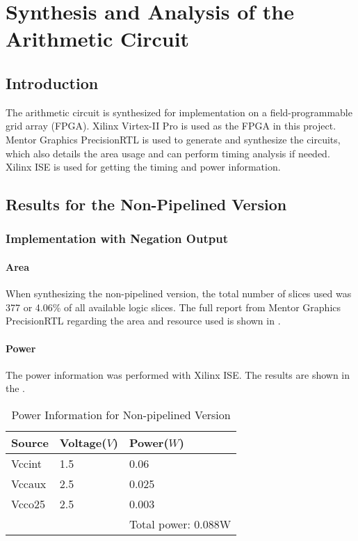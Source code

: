 \section{Synthesis and Analysis of the Arithmetic Circuit}

\subsection{Introduction}

The arithmetic circuit is synthesized for implementation on a field-programmable grid array (FPGA).
Xilinx Virtex-II Pro is used as the FPGA in this project.
Mentor Graphics PrecisionRTL is used to generate and synthesize the circuits,
which also details the area usage and can perform timing analysis if needed.
Xilinx ISE is used for getting the timing and power information.

\subsection{Results for the Non-Pipelined Version}
\subsubsection{Implementation with Negation Output}
\paragraph{Area}

When synthesizing the non-pipelined version, the total number of slices used was 377 or 4.06\% 
of all available logic slices. The full report from Mentor Graphics PrecisionRTL regarding the area
and resource used is shown in .

\paragraph{Power}

\noindent The power information was performed with Xilinx ISE. The results are shown in the .

\begin{table}[!ht]
	\renewcommand{\arraystretch}{1.3}
	\caption{Power Information for Non-pipelined Version}
	\centering
	\begin{tabular}{ p{4cm} p{4cm} p{4cm} }
		\hline
		\bfseries Source & \bfseries Voltage(\(V\)) & \bfseries Power(\(W\)) \\
		\hline
		Vccint           & 1.5                      & 0.06                   \\
		Vccaux           & 2.5                      & 0.025                  \\
		Vcco25           & 2.5                      & 0.003                  \\
		\hline
		                 &                          & Total power: 0.088W    \\
	\end{tabular}
	\label{tb:non_p_power}
\end{table}

